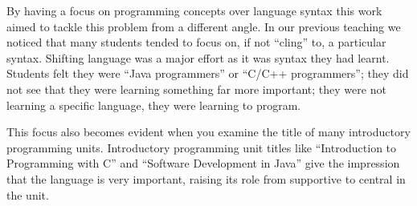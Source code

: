 By having a focus on programming concepts over language syntax this work aimed to tackle this problem from a different angle. In our previous teaching we noticed that many students tended to focus on, if not ``cling'' to, a particular syntax. Shifting language was a major effort as it was syntax they had learnt. Students felt they were ``Java programmers'' or ``C/C++ programmers''; they did not see that they were learning something far more important; they were not learning a specific language, they were learning to program. 

This focus also becomes evident when you examine the title of many introductory programming units. Introductory programming unit titles like ``Introduction to Programming with C'' and ``Software Development in Java'' give the impression that the language is very important, raising its role from supportive to central in the unit.

%
% 
% 
% 


